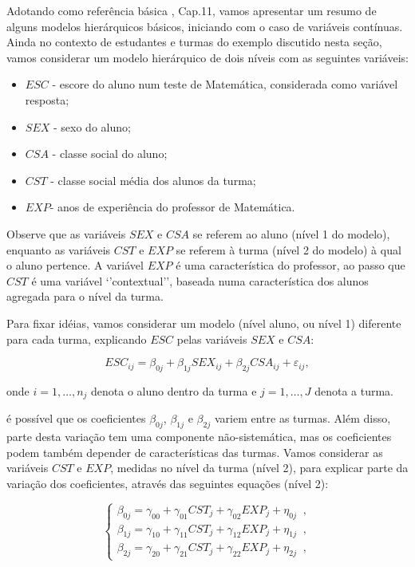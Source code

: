 \documentclass[]{book}
\theoremstyle{definition}
\theoremstyle{definition}
\theoremstyle{definition}
\theoremstyle{remark}
\begin{document}
Adotando como referência básica \citep{Sk89a}, Cap.11, vamos apresentar
um resumo de alguns modelos hierárquicos básicos, iniciando com o caso
de variáveis contínuas. Ainda no contexto de estudantes e turmas do
exemplo discutido nesta seção, vamos considerar um modelo hierárquico de
dois níveis com as seguintes variáveis:

\begin{itemize}
\item
  \(ESC\) - escore do aluno num teste de Matemática, considerada como
  variável resposta;
\item
  \(SEX\) - sexo do aluno;
\item
  \(CSA\) - classe social do aluno;
\item
  \(CST\) - classe social média dos alunos da turma;
\item
  \(EXP\)- anos de experiência do professor de Matemática.
\end{itemize}

Observe que as variáveis \(SEX\) e \(CSA\) se referem ao aluno (nível 1
do modelo), enquanto as variáveis \(CST\) e \(EXP\) se referem à turma
(nível 2 do modelo) à qual o aluno pertence. A variável \(EXP\) é uma
característica do professor, ao passo que \(CST\) é uma variável
`'contextual'', baseada numa característica dos alunos agregada para o
nível da turma.

Para fixar idéias, vamos considerar um modelo (nível aluno, ou nível 1)
diferente para cada turma, explicando \(ESC\) pelas variáveis \(SEX\) e
\(CSA\):

\begin{equation}
ESC_{ij}=\beta _{0j}+\beta _{1j}SEX_{ij}+\beta _{2j}CSA_{ij}+\varepsilon
_{ij},  \label{eq:hier9}
\end{equation}

onde \(i=1,\ldots ,n_{j}\) denota o aluno dentro da turma e
\(j=1,\ldots ,J\) denota a turma.

é possível que os coeficientes \(\beta _{0j}\), \(\beta _{1j}\) e
\(\beta _{2j}\) variem entre as turmas. Além disso, parte desta variação
tem uma componente não-sistemática, mas os coeficientes podem também
depender de características das turmas. Vamos considerar as variáveis
\(CST\) e \(EXP\), medidas no nível da turma (nível 2), para explicar
parte da variação dos coeficientes, através das seguintes equações
(nível 2):

\begin{equation}
\left\{ 
\begin{array}{l}
\beta _{0j}=\gamma _{00}+\gamma _{01}CST_{j}+\gamma _{02}EXP_{j}+\eta
_{0j}\;\;, \\ 
\beta _{1j}=\gamma _{10}+\gamma _{11}CST_{j}+\gamma _{12}EXP_{j}+\eta
_{1j}\;\;, \\ 
\beta _{2j}=\gamma _{20}+\gamma _{21}CST_{j}+\gamma _{22}EXP_{j}+\eta
_{2j}\;\;,
\end{array}
\right.  \label{eq:hier10}
\end{equation}
\end{document}
